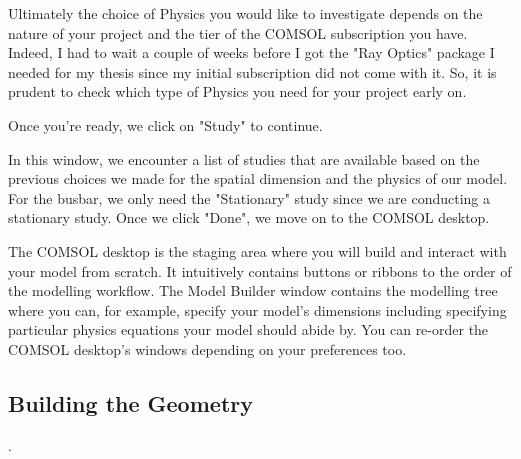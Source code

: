 Ultimately the choice of Physics you would like to investigate depends on the nature of your project and the tier of the COMSOL subscription you have. Indeed, I had to wait a couple of weeks before I got the "Ray Optics" package I needed for my thesis since my initial subscription did not come with it. So, it is prudent to check which type of Physics you need for your project early on.

Once you're ready, we click on "Study" to continue.


In this window, we encounter a list of studies that are available based on the previous choices we made for the spatial dimension and the physics of our model. For the busbar, we only need the "Stationary" study since we are conducting a stationary study. Once we click "Done", we move on to the COMSOL desktop.


The COMSOL desktop is the staging area where you will build and interact with your model from scratch. It intuitively contains buttons or ribbons to the order of the modelling workflow. The Model Builder window contains the modelling tree where you can, for example, specify your model's dimensions including specifying particular physics equations your model should abide by. You can re-order the COMSOL desktop's windows depending on your preferences too.

\subsection{Building the Geometry}.
